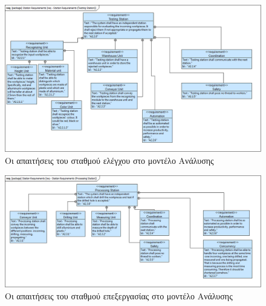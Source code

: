 \documentclass[a4paper,12pt,twoside]{report}
\begin{document}
\begin{appendices}
			\begin{figure}[hp]
					\centering
					\includegraphics[scale=0.30]{AnalysisModel_req-StationRequirements(TestingStation).png}
					\caption{Οι απαιτήσεις του σταθμού ελέγχου στο μοντέλο Ανάλυσης}
					\label{φωτ:Οι απαιτήσεις του σταθμού ελέγχου στο μοντέλο Ανάλυσης}
			\end{figure}
			
			\begin{figure}[hp]
					\centering
					\includegraphics[scale=0.30]{AnalysisModel_req-StationRequirements(ProcessingStation).png}
					\caption{Οι απαιτήσεις του σταθμού επεξεργασίας στο μοντέλο Ανάλυσης}
					\label{φωτ:Οι απαιτήσεις του σταθμού επεξεργασίας στο μοντέλο Ανάλυσης}
			\end{figure}
			

\end{appendices}
\end{document}

